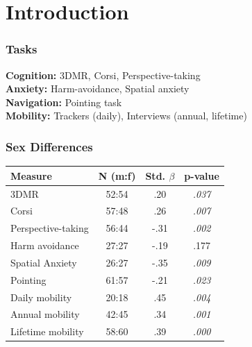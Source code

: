 \documentclass{beamer}
\begin{document}

\section{Introduction}


\begin{frame}

\frametitle{Tasks}

\textbf{Cognition:} 3DMR, Corsi, Perspective-taking \\
\vspace{0.75cm}
\textbf{Anxiety:} Harm-avoidance, Spatial anxiety \\
\vspace{0.75cm}
\textbf{Navigation:} Pointing task \\
\vspace{0.75cm}
\textbf{Mobility:} Trackers (daily), Interviews (annual, lifetime)

\end{frame}


\begin{frame}

\frametitle{Sex Differences}
\begin{table}
\begin{tabular}{l c c c}
\toprule
\textbf{Measure} & \textbf{N (m:f)} & \textbf{Std. $\beta$} & \textbf{p-value}\\ 
\midrule
3DMR & 52:54 & .20 & \emph{.037}\\
Corsi & 57:48 & .26 & \emph{.007}\\
Perspective-taking & 56:44 & -.31 & \emph{.002}\\
Harm avoidance & 27:27 & -.19 & .177\\
Spatial Anxiety & 26:27 & -.35 & \emph{.009}\\
Pointing & 61:57 & -.21 & \emph{.023}\\
Daily mobility & 20:18 & .45 & \emph{.004}\\
Annual mobility & 42:45 & .34 & \emph{.001}\\
Lifetime mobility & 58:60 & .39 & \emph{.000}\\
\bottomrule
\end{tabular}
\end{table}

\end{frame}
\end{document}

